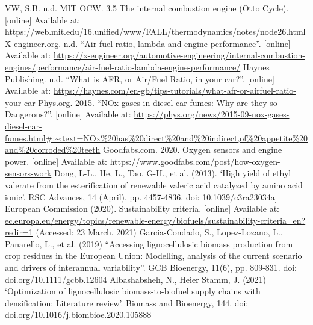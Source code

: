 \documentclass[11pt]{article}
\begin{document}
\begin{thebibliography}{00}
 VW, S.B. n.d. MIT OCW. 3.5 The internal combustion engine (Otto Cycle). [online] Available at: \url{https://web.mit.edu/16.unified/www/FALL/thermodynamics/notes/node26.html}
X-engineer.org. n.d. ``Air-fuel ratio, lambda and engine performance''. [online] Available at: \url{https://x-engineer.org/automotive-engineering/internal-combustion-engines/performance/air-fuel-ratio-lambda-engine-performance/}
 Haynes Publishing. n.d. ``What is AFR, or Air/Fuel Ratio, in your car?''. [online] Available at: \url{https://haynes.com/en-gb/tips-tutorials/what-afr-or-airfuel-ratio-your-car}
 Phys.org. 2015. ``NOx gases in diesel car fumes: Why are they so Dangerous?''. [online] Available at: \url{https://phys.org/news/2015-09-nox-gases-diesel-car-fumes.html#:~:text=NOx\%20has\%20direct\%20and\%20indirect,of\%20appetite\%20and\%20corroded\%20teeth} 
 Goodfabs.com. 2020. Oxygen sensors and engine power. [online] Available at: \url{https://www.goodfabs.com/post/how-oxygen-sensors-work}
 Dong, L-L., He, L., Tao, G-H., et al. (2013). ‘High yield of ethyl valerate from the esterification of renewable valeric acid catalyzed by amino acid ionic’. RSC Advances, 14 (April), pp. 4457-4836. doi: 10.1039/c3ra23034a]
 European Commission (2020).  Sustainability criteria. [online] Available at: \url{ec.europa.eu/energy/topics/renewable-energy/biofuels/sustainability-criteria_en?redir=1} (Accessed: 23 March. 2021)
 Garcia-Condado, S., Lopez-Lozano, L., Panarello, L., et al. (2019) ``Accessing lignocellulosic biomass production from crop residues in the European Union: Modelling, analysis of the current scenario and drivers of interannual variability''. GCB Bioenergy, 11(6), pp. 809-831. doi: doi.org/10.1111/gcbb.12604
 Albashabsheh, N., Heier Stamm, J. (2021) ‘Optimization of lignocellulosic biomass-to-biofuel supply chains with densification: Literature review’. Biomass and Bioenergy, 144. doi: doi.org/10.1016/j.biombioe.2020.105888
\end{thebibliography}
\end{document}
